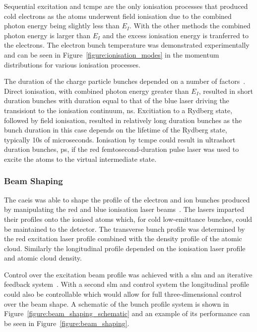 Sequential excitation and \gls{tcmpe} are the only ionisation processes that produced cold electrons as the atoms underwent field ionisation due to the combined photon energy being slightly less than $E_I$.
With the other methods the combined photon energy is larger than $E_I$ and the excess ionisation energy is tranferred to the electrons.
The electron bunch temperature was demonstrated experimentally~\cite{speirs_identification_2017} and can be seen in Figure~\ref{figure:ionisation_modes} in the momentum distributions for various ionisation processes.

The duration of the charge particle bunches depended on a number of factors~\cite{speirs_identification_2017}.
Direct ionisation, with combined photon energy greater than $E_I$, resulted in short duration bunches with duration equal to that of the blue laser driving the transisiont to the ionisation continuum, \unit[5]{ns}.
Excitiation to a Rydberg state, followed by field ionisation, resulted in relatively long duration bunches as the bunch duration in this case depends on the lifetime of the Rydberg state, typically 10s of microseconds.
Ionisation by \gls{tcmpe} could result in ultrashort duration bunches, \unit[10]{ps}, if the red femtosecond-duration pulse laser was used to excite the atoms to the virtual intermediate state.

\subsubsection{Beam Shaping}

The \gls{caeis} was able to shape the profile of the electron and ion bunches produced by manipulating the red and blue ionisation laser beams~\cite{mcculloch_arbitrarily_2011}.
The lasers imparted their profiles onto the ionised atoms which, for cold low-emittance bunches, could be maintained to the detector.
The transverse bunch profile was determined by the red excitation laser profile combined with the density profile of the atomic cloud.
Similarly the longitudinal profile depended on the ionisation laser profile and atomic cloud density.

Control over the excitation beam profile was achieved with a \gls{slm} and an iterative feedback system~\cite{van_bijnen_patterned_2015}.
With a second \gls{slm} and control system the longitudinal profile could also be controllable which would allow for full three-dimensional control over the beam shape.
A schematic of the bunch profile system is shown in Figure~\ref{figure:beam_shaping_schematic} and an example of its performance can be seen in Figure~\ref{figure:beam_shaping}.

